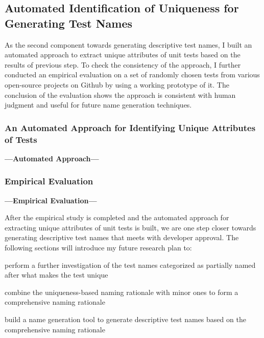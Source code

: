 \subsection{Automated Identification of Uniqueness for Generating Test Names}
\label{sec:uniquness-approach}

As the second component towards generating descriptive test names, I built an automated approach to extract unique attributes of unit tests based on the results of previous step.
%
To check the consistency of the approach, I further conducted an empirical evaluation on a set of randomly chosen tests from various open-source projects on Github by using a working prototype of it.
%
The conclusion of the evaluation shows the approach is consistent with human judgment and useful for future name generation techniques.


\subsubsection{An Automated Approach for Identifying Unique Attributes of Tests}
\textbf{---Automated Approach---}

\subsubsection{Empirical Evaluation}
\label{sec:emp-eval-attributes}
\textbf{---Empirical Evaluation---}


After the empirical study is completed and the automated approach for extracting unique attributes of unit tests is built, we are one step closer towards generating descriptive test names that meets with developer approval.
%
The following sections will introduce my future research plan to:
\begin{enumerate*}
    \item perform a further investigation of the test names categorized as partially named after what makes the test unique
    \item combine the uniqueness-based naming rationale with minor ones to form a comprehensive naming rationale
    \item build a name generation tool to generate descriptive test names based on the comprehensive naming rationale 
\end{enumerate*}

